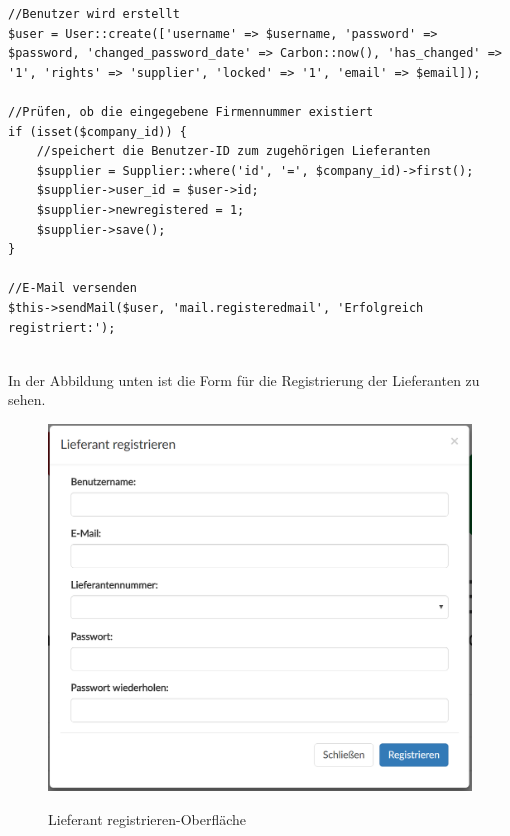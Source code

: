 \begin{lstlisting}
//Benutzer wird erstellt
$user = User::create(['username' => $username, 'password' => $password, 'changed_password_date' => Carbon::now(), 'has_changed' => '1', 'rights' => 'supplier', 'locked' => '1', 'email' => $email]);

//Prüfen, ob die eingegebene Firmennummer existiert
if (isset($company_id)) {
	//speichert die Benutzer-ID zum zugehörigen Lieferanten
	$supplier = Supplier::where('id', '=', $company_id)->first();
	$supplier->user_id = $user->id;
	$supplier->newregistered = 1;
	$supplier->save();
}

//E-Mail versenden
$this->sendMail($user, 'mail.registeredmail', 'Erfolgreich registriert:');
                
\end{lstlisting}

\newpage
In der Abbildung unten ist die Form für die Registrierung der Lieferanten zu sehen.
\begin{figure}[!h]
    \centering
    \includegraphics[width=17cm]{figures/registermock.png}
    \label{fig:takebill}
    \caption{Lieferant registrieren-Oberfläche}
\end{figure}

